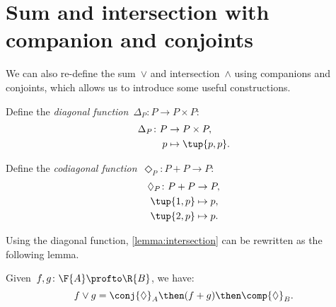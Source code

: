 \section{Sum and intersection with companion and conjoints}

We can also re-define the sum~$\vee$ and intersection~$\wedge$ using companions and conjoints, which allows us to introduce some useful constructions.

\begin{definition}
    Define the \emph{diagonal function}~$\Delta_P\colon P \to P \times P$:
    \begin{equation}
        \begin{aligned}
            \Delta_P \colon P & \to P \times P, \\
            p & \mapsto \tup{p, p}.
        \end{aligned}
    \end{equation}
\end{definition}

\begin{definition}
    Define the \emph{codiagonal function}~$\Diamond_P\colon P+P \to P $:
    \begin{equation}
        \begin{aligned}
            \Diamond_P \colon P + P & \to P,  \\
            \tup{1,p} & \mapsto p, \\
            \tup{2,p} & \mapsto p.
        \end{aligned}
    \end{equation}
\end{definition}

\noindent Using the diagonal function, \cref{lemma:intersection} can be rewritten as the following lemma.

\begin{lemma}
    Given~$f, g\colon \F{A} \profto \R{B}$, we have:
    \begin{equation}
        f \vee g =  \conj{\Diamond}_A \then (f + g)\then \comp{\Diamond}_B.
    \end{equation}
\end{lemma}

